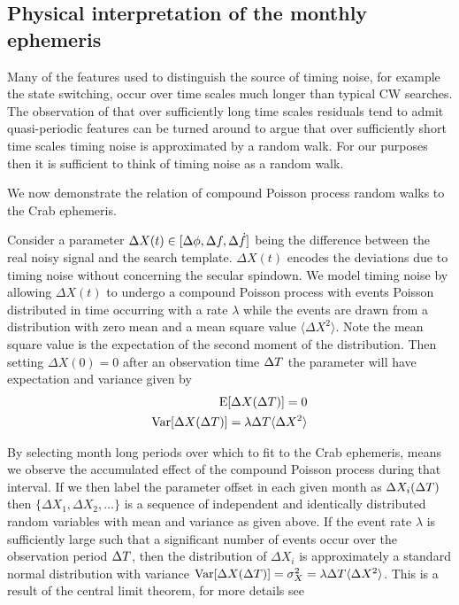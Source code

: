 \documentclass[../full_thesis/full_thesis.tex]{subfiles}
\begin{document}
\FloatBarrier

\subsection{Physical interpretation of the monthly ephemeris}
\label{sec: physical interpretation of the monthly ephemeris}
Many of the features used to distinguish the source of timing noise, for
example the state switching, occur over time scales much longer than typical 
CW searches. The observation of \citet{Hobbs2010} that over sufficiently 
long time scales residuals tend to admit quasi-periodic features can be 
turned around to argue that over sufficiently short time scales timing noise
is approximated by a random walk. For our purposes then it is sufficient 
to think of timing noise as a random walk. 

We now demonstrate the relation of
compound Poisson process random walks to the Crab ephemeris.

Consider a parameter $\Delta X(t) \in [\Delta\phi, \Delta f,\Delta\dot{f}]$ being
the difference between the real noisy signal and the search template. $\Delta
X(t)$ encodes the deviations due to timing noise without concerning the secular
spindown. We model timing noise by allowing $\Delta X(t)$ to undergo a compound
Poisson process with events Poisson distributed in time occurring with a rate
$\lambda$ while the events are drawn from a distribution with zero mean and 
a mean square value $\langle\Delta X^{2}\rangle$. Note the mean square value is
the expectation of the second moment of the distribution. Then setting $\Delta
X(0)=0$ after an observation time $\Delta T$  the parameter will have expectation
and variance given by \begin{align} \textrm{E}[\Delta X(\Delta T)] = 0 \label{eqn:
    Poisson expectation} \\ \textrm{Var}[\Delta X(\Delta T)] = \lambda \Delta T
    \langle\Delta X^{2}\rangle \label{eqn: Poisson variance} \end{align}

By selecting month long periods over which to fit to the Crab ephemeris, means
we observe the accumulated effect of the compound Poisson process during that
interval. If we then label the parameter offset in each given month as $\Delta
X_{i}(\Delta T)$ then $\{\Delta X_{1}, \Delta X_{2}, \dots\}$ is a sequence of
independent and identically distributed random variables with mean and variance
as given above.  If the event rate $\lambda$ is sufficiently large such that a
significant number of events occur over the observation period $\Delta T$, then the
distribution of $\Delta X_{i}$ is approximately a standard normal distribution
with variance $\textrm{Var}[\Delta X(\Delta T)] =\sigma_{X}^{2} = \lambda \Delta T
\langle\Delta X^{2}\rangle$. This is a result of the central limit theorem, for
more details see \citet{Feller1968}
\end{document}
